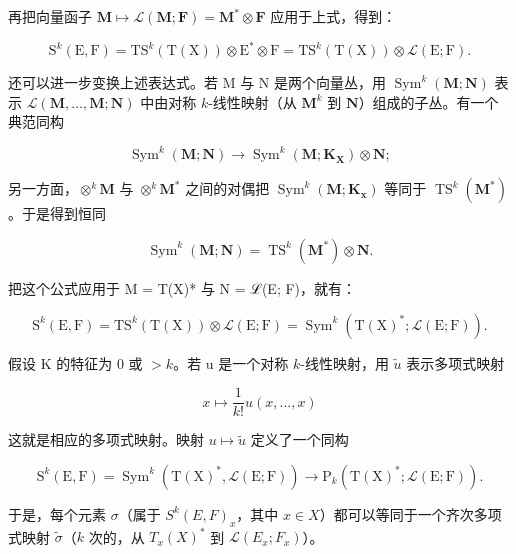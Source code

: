 再把向量函子 \(\mathbf{M} \mapsto \mathcal{L}(\mathbf{M}; \mathbf{F}) = \mathbf{M}^* \otimes \mathbf{F}\) 应用于上式，得到：

\[
\mathrm{S} ^ {k} (\mathrm{E}, \mathrm{F}) = \mathrm{T} \mathrm{S} ^ {k} (\mathrm{T} (\mathrm{X})) \otimes \mathrm{E} ^ {*} \otimes \mathrm{F} = \mathrm{T} \mathrm{S} ^ {k} (\mathrm{T} (\mathrm{X})) \otimes \mathscr {L} (\mathrm{E}; \mathrm{F}).
\]

还可以进一步变换上述表达式。若 M 与 N 是两个向量丛，用 \(\operatorname{Sym}^{k}(\mathbf{M};\mathbf{N})\) 表示 \(\mathcal{L}(\mathbf{M},\ldots,\mathbf{M};\mathbf{N})\) 中由对称 \(k\)-线性映射（从 \(\mathbf{M}^{k}\) 到 \(\mathbf{N}\)）组成的子丛。有一个典范同构

\[
\operatorname{Sym} ^ {k} (\mathbf {M}; \mathbf {N}) \rightarrow \operatorname{Sym} ^ {k} (\mathbf {M}; \mathbf {K} _ {\mathbf {X}}) \otimes \mathbf {N};
\]

另一方面，\(\otimes^{k}\mathbf{M}\) 与 \(\otimes^{k}\mathbf{M}^{*}\) 之间的对偶把 \(\operatorname{Sym}^{k}(\mathbf{M};\mathbf{K}_{\mathbf{x}})\) 等同于 \(\operatorname{TS}^{k}(\mathbf{M}^{*})\)。于是得到恒同

\[
\operatorname{Sym} ^ {k} (\mathbf {M}; \mathbf {N}) = \operatorname{TS} ^ {k} (\mathbf {M} ^ {*}) \otimes \mathbf {N}.
\]

把这个公式应用于 M = T(X)* 与 N = ℒ(E; F)，就有：

\[
\mathrm{S} ^ {k} (\mathrm{E}, \mathrm{F}) = \mathrm{T} \mathrm{S} ^ {k} (\mathrm{T} (\mathrm{X})) \otimes \mathscr {L} (\mathrm{E}; \mathrm{F}) = \operatorname{Sym} ^ {k} (\mathrm{T} (\mathrm{X}) ^ {*}; \mathscr {L} (\mathrm{E}; \mathrm{F})).
\]

假设 K 的特征为 0 或 \(>k\)。若 u 是一个对称 \(k\)-线性映射，用 \(\tilde{u}\) 表示多项式映射

\[
x \mapsto \frac {1}{k !} u (x, \dots , x)
\]

这就是相应的多项式映射。映射 \(u \mapsto \tilde{u}\) 定义了一个同构

\[
\mathrm{S} ^ {k} (\mathrm{E}, \mathrm{F}) = \operatorname{Sym} ^ {k} (\mathrm{T} (\mathrm{X}) ^ {*}, \mathscr {L} (\mathrm{E}; \mathrm{F})) \rightarrow \mathrm{P} _ {k} (\mathrm{T} (\mathrm{X}) ^ {*}; \mathscr {L} (\mathrm{E}; \mathrm{F})).
\]

于是，每个元素 \(\sigma\)（属于 \(S^{k}(E,F)_{x}\)，其中 \(x\in X\)）都可以等同于一个齐次多项式映射 \(\tilde{\sigma}\)（\(k\) 次的，从 \(T_{x}(X)^{*}\) 到 \(\mathcal{L}(E_{x};F_{x})\)）。

